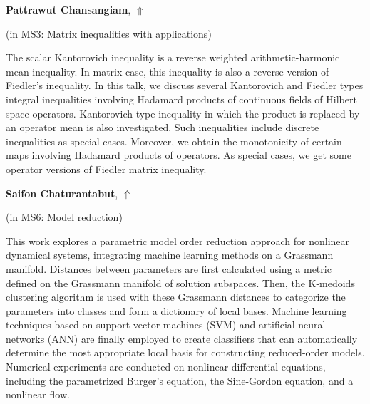 \documentclass[ILAS2025-program.tex]{subfiles}
\begin{document}
     \hypertarget{down0145}{}\begin{ilasabstract}
    
    \textbf{Pattrawut Chansangiam},  \hfill \hyperlink{up0145}{$\Uparrow$}
    
    (in {\color{mstitle}MS3: Matrix inequalities with applications})
        
        \mtskip
    The scalar Kantorovich inequality is a reverse weighted arithmetic-harmonic mean
inequality. In matrix case, this inequality is also a reverse version of Fiedler’s inequality. In
this talk, we discuss several Kantorovich and Fiedler types integral inequalities involving
Hadamard products of continuous fields of Hilbert space operators. Kantorovich type inequality
in which the product is replaced by an operator mean is also investigated. Such inequalities
include discrete inequalities as special cases. Moreover, we obtain the monotonicity of certain
maps involving Hadamard products of operators. As special cases, we get some operator versions of Fiedler matrix inequality.
\end{ilasabstract}
     \hypertarget{down0165}{}\begin{ilasabstract}
    
    \textbf{Saifon Chaturantabut},  \hfill \hyperlink{up0165}{$\Uparrow$}
    
    (in {\color{mstitle}MS6: Model reduction})
        
        \mtskip
    This work explores a parametric model order reduction approach for nonlinear dynamical systems, integrating machine learning methods on a Grassmann manifold. Distances between parameters are first calculated using a metric defined on the Grassmann manifold of solution subspaces. Then, the K-medoids clustering algorithm is used with these Grassmann distances to categorize the parameters into classes and form a dictionary of local bases. Machine learning techniques based on support vector machines (SVM) and artificial neural networks (ANN) are finally employed to create classifiers that can automatically determine the most appropriate local basis for constructing reduced-order models. Numerical experiments are conducted on nonlinear differential equations, including the parametrized Burger's equation, the Sine-Gordon equation, and a nonlinear flow.
\end{ilasabstract}
\end{document}
